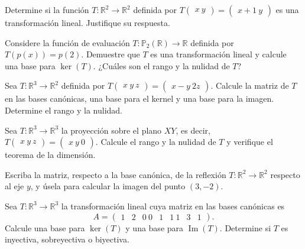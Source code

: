 \begin{prob}
Determine si la función $T:\mathbb{R}^2 \to \mathbb{R}^2$ definida por $T\begin{pmatrix} x \ y \end{pmatrix} = \begin{pmatrix} x+1 \ y \end{pmatrix}$ es una transformación lineal. Justifique su respuesta.
\end{prob}

\begin{prob}
Considere la función de evaluación $T:\mathbb{P}_2(\mathbb{R}) \to \mathbb{R}$ definida por $T(p(x)) = p(2)$. Demuestre que $T$ es una transformación lineal y calcule una base para $\ker(T)$. ¿Cuáles son el rango y la nulidad de $T$?
\end{prob}

\begin{prob}
Sea $T:\mathbb{R}^3 \to \mathbb{R}^2$ definida por $T\begin{pmatrix} x \ y \ z \end{pmatrix} = \begin{pmatrix} x - y \ 2z \end{pmatrix}$. Calcule la matriz de $T$ en las bases canónicas, una base para el kernel y una base para la imagen. Determine el rango y la nulidad.
\end{prob}

\begin{prob}
Sea $T:\mathbb{R}^3 \to \mathbb{R}^3$ la proyección sobre el plano $XY$, es decir, $T\begin{pmatrix} x \ y \ z \end{pmatrix} = \begin{pmatrix} x \ y \ 0 \end{pmatrix}$. Calcule el rango y la nulidad de $T$ y verifique el teorema de la dimensión.
\end{prob}

\begin{prob}
Escriba la matriz, respecto a la base canónica, de la reflexión $T:\mathbb{R}^2 \to \mathbb{R}^2$ respecto al eje $y$, y úsela para calcular la imagen del punto $(3, -2)$.
\end{prob}

\begin{prob}
Sea $T:\mathbb{R}^3 \to \mathbb{R}^3$ la transformación lineal cuya matriz en las bases canónicas es
\[
A = \begin{pmatrix} 1 & 2 & 0 \ 0 & 1 & 1 \ 1 & 3 & 1 \end{pmatrix}.
\]
Calcule una base para $\ker(T)$ y una base para $\operatorname{Im}(T)$. Determine si $T$ es inyectiva, sobreyectiva o biyectiva.
\end{prob}

